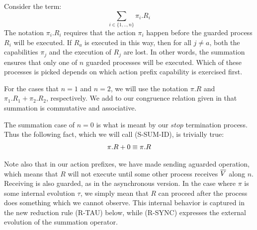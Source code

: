 Consider the term:
\[
	\sum_{i\in \{1,..,n\}} \pi_i.R_i
\]
The notation $\pi_i.R_i$ requires that the action $\pi_i$ happen before the guarded process $R_i$ will be executed.  
If $R_a$ is executed in this way, then for all $j \neq a$, both the capabilities $\pi_j$ and the execution of $R_j$ are lost.  
In other words, the summation ensures that only one of $n$ guarded processes will be executed. 
Which of these processes is picked depends on which action prefix capability is exercised first. 

For the cases that $n=1$ and $n=2$, we will use the notation $\pi.R$ and $\pi_1.R_1 + \pi_2.R_2$, respectively.  
We add to our congruence relation given in  that summation is commutative and associative.

The summation case of $n=0$ is what is meant by our $stop$ termination process.  
Thus the following fact, which we will call (S-SUM-ID), is trivially true:
\begin{align*}
	\pi.R + 0 \equiv \pi.R
\end{align*}

Note also that in our action prefixes, we have made sending aguarded operation, which means that $R$ will not execute until some other process receives $\overline{V}$ along $n$.  
 Receiving is also guarded, as in the asynchronous version.  
In the case where $\pi$ is some internal evolution $\tau$, we simply mean that $R$ can proceed after the process does something which we cannot observe.  
This internal behavior is captured in the new reduction rule (R-TAU) below, while (R-SYNC) expresses the external evolution of the summation operator.


